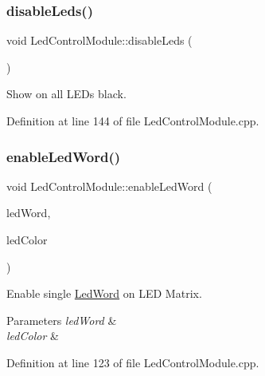 \subsubsection{\texorpdfstring{disableLeds()}{disableLeds()}}
{\footnotesize\ttfamily void Led\+Control\+Module\+::disable\+Leds (\begin{DoxyParamCaption}{ }\end{DoxyParamCaption})}



Show on all L\+E\+Ds black. 



Definition at line 144 of file Led\+Control\+Module.\+cpp.

\mbox{\label{class_led_control_module_a5870c6c37010e51f6b3dbe4611a1c05c}} 
\subsubsection{\texorpdfstring{enableLedWord()}{enableLedWord()}}
{\footnotesize\ttfamily void Led\+Control\+Module\+::enable\+Led\+Word (\begin{DoxyParamCaption}\item[{const \mbox{\hyperlink{class_led_word}{Led\+Word}} $\ast$}]{led\+Word,  }\item[{const Rgbw\+Color \&}]{led\+Color }\end{DoxyParamCaption})\hspace{0.3cm}{\ttfamily [private]}}



Enable single \mbox{\hyperlink{class_led_word}{Led\+Word}} on L\+ED Matrix. 


\begin{DoxyParams}{Parameters}
{\em led\+Word} & \\
\hline
{\em led\+Color} & \\
\hline
\end{DoxyParams}


Definition at line 123 of file Led\+Control\+Module.\+cpp.

\mbox{\label{class_led_control_module_ac2e92014634c3cbfbcecff4473f39dac}} 
